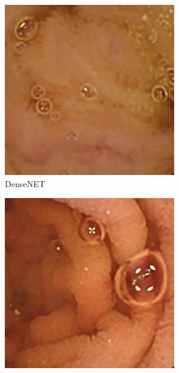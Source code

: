 \begin{figure}[H]
  \begin{subfigure}[b]{0.275\textwidth}
    \includegraphics[width=\textwidth]{Chapter7/Dense_9.jpg}
    \caption{DenseNET}
  \end{subfigure}
  \begin{subfigure}[b]{0.275\textwidth}
    \includegraphics[width=\textwidth]{Chapter7/Dense_445.jpg}

\end{subfigure}
\end{figure}
